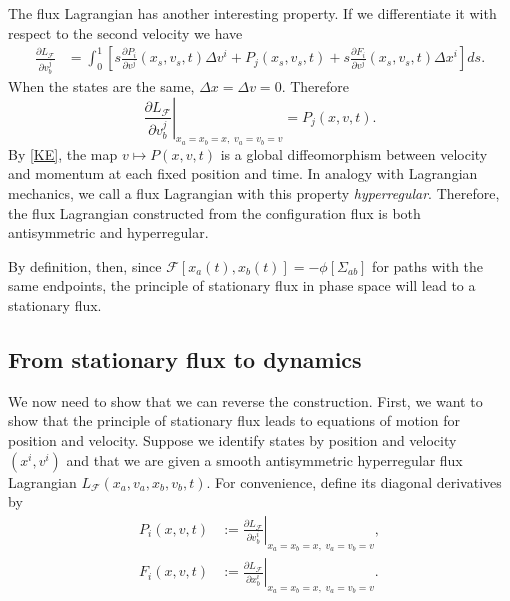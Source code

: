 \documentclass[12pt]{article}
\begin{document}
The flux Lagrangian has another interesting property. If we differentiate it with respect to the second velocity we have
\begin{equation}
	\begin{aligned}
		\frac{\partial L_{\mathcal{F}}}{\partial v_b^j}
		&=
		\int_0^1
		\left[
		s\frac{\partial P_i}{\partial v^j}(x_s,v_s,t)
		\Delta v^i
		+P_j(x_s,v_s,t)
		+s\frac{\partial F_i}{\partial v^j}(x_s,v_s,t)
		\Delta x^i
		\right]ds.
	\end{aligned}
\end{equation}
When the states are the same, $\Delta x=\Delta v=0$. Therefore
\begin{equation}
	\left.
	\frac{\partial L_{\mathcal{F}}}{\partial v_b^j}
	\right|_{x_a=x_b=x,\;v_a=v_b=v}
	=
	P_j(x,v,t).
\end{equation}
By \ref{KE}, the map $v \mapsto P(x,v,t)$ is a global diffeomorphism between velocity and momentum at each fixed position and time. In analogy with Lagrangian mechanics, we call a flux Lagrangian with this property \emph{hyperregular}. Therefore, the flux Lagrangian constructed from the configuration flux is both antisymmetric and hyperregular.

By definition, then, since $\mathcal{F}[x_a(t),x_b(t)]=-\phi[\Sigma_{ab}]$ for paths with the same endpoints, the principle of stationary flux in phase space will lead to a stationary flux.

\subsection{From stationary flux to dynamics}

We now need to show that we can reverse the construction. First, we want to show that the principle of stationary flux leads to equations of motion for position and velocity. Suppose we identify states by position and velocity $(x^i,v^i)$ and that we are given a smooth antisymmetric hyperregular flux Lagrangian $L_{\mathcal{F}}(x_a,v_a,x_b,v_b,t)$. For convenience, define its diagonal derivatives by
\begin{equation}\label{eq:fluxLagrangianDiagonal}
	\begin{aligned}
		P_i(x,v,t)
		&:=
		\left.
		\frac{\partial L_{\mathcal{F}}}{\partial v_b^i}
		\right|_{x_a=x_b=x,\;v_a=v_b=v},\\
		F_i(x,v,t)
		&:=
		\left.
		\frac{\partial L_{\mathcal{F}}}{\partial x_b^i}
		\right|_{x_a=x_b=x,\;v_a=v_b=v}.
	\end{aligned}
\end{equation}
\end{document}
